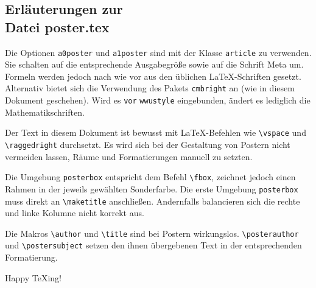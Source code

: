 \documentclass{article}
\begin{document}
\maketitle
\begin{posterbox}

\vspace{-10mm}

\section*{Erläuterungen zur\\ Datei poster.tex}

\raggedright

Die Optionen \verb+a0poster+ und \verb+a1poster+ sind mit der Klasse \verb+article+ zu verwenden.
Sie schalten auf die entsprechende Ausgabegröße sowie auf die Schrift Meta um.
Formeln werden jedoch nach wie vor aus den üblichen \LaTeX{}-Schriften gesetzt.
Alternativ bietet sich die Verwendung des Pakets \verb+cmbright+ an (wie in diesem Dokument geschehen). Wird es \verb+vor+ \verb+wwustyle+
eingebunden, ändert es lediglich die Mathematikschriften.



Der Text in diesem Dokument ist bewusst mit \LaTeX{}-Befehlen wie \verb+\vspace+
und \verb+\raggedright+ durchsetzt. Es wird sich bei der Gestaltung von Postern nicht
vermeiden lassen, Räume und Formatierungen manuell zu setzten.

Die Umgebung \verb+posterbox+  entspricht dem Befehl \verb+\fbox+, zeichnet jedoch einen
Rahmen in der jeweils gewählten Sonderfarbe. Die erste Umgebung \verb+posterbox+ muss
direkt an \verb+\maketitle+ anschließen. Andernfalls balancieren sich die rechte und
linke Kolumne nicht korrekt aus.

Die Makros \verb+\author+ und \verb+\title+ sind bei Postern wirkungslos.
\verb+\posterauthor+ und \verb+\postersubject+ setzen den ihnen übergebenen
Text in der entsprechenden Formatierung.

\bigskip

Happy \TeX{}ing!


\end{posterbox}
\end{document}

